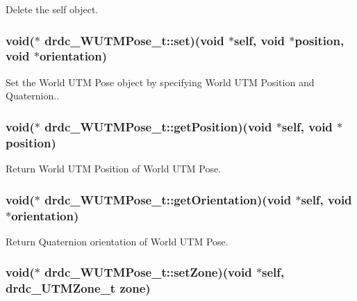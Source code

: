 Delete the self object. 

\hypertarget{structdrdc__WUTMPose__t_3f4c484b88cbd7ffcfc65f52f39c43b8}{
\subsubsection[set]{\setlength{\rightskip}{0pt plus 5cm}void($\ast$ {\bf drdc\_\-WUTMPose\_\-t::set})(void $\ast$self, void $\ast$position, void $\ast$orientation)}}
\label{structdrdc__WUTMPose__t_3f4c484b88cbd7ffcfc65f52f39c43b8}


Set the World UTM Pose object by specifying World UTM Position and Quaternion.. 

\hypertarget{structdrdc__WUTMPose__t_93bd3f174f9a41aac4503486bff58c46}{
\subsubsection[getPosition]{\setlength{\rightskip}{0pt plus 5cm}void($\ast$ {\bf drdc\_\-WUTMPose\_\-t::getPosition})(void $\ast$self, void $\ast$position)}}
\label{structdrdc__WUTMPose__t_93bd3f174f9a41aac4503486bff58c46}


Return World UTM Position of World UTM Pose. 

\hypertarget{structdrdc__WUTMPose__t_932663f57244d6db21db5e0966109373}{
\subsubsection[getOrientation]{\setlength{\rightskip}{0pt plus 5cm}void($\ast$ {\bf drdc\_\-WUTMPose\_\-t::getOrientation})(void $\ast$self, void $\ast$orientation)}}
\label{structdrdc__WUTMPose__t_932663f57244d6db21db5e0966109373}


Return Quaternion orientation of World UTM Pose. 

\hypertarget{structdrdc__WUTMPose__t_03c3cce9de57689df2b2d2e777812947}{
\subsubsection[setZone]{\setlength{\rightskip}{0pt plus 5cm}void($\ast$ {\bf drdc\_\-WUTMPose\_\-t::setZone})(void $\ast$self, {\bf drdc\_\-UTMZone\_\-t} {\bf zone})}}
\label{structdrdc__WUTMPose__t_03c3cce9de57689df2b2d2e777812947}


